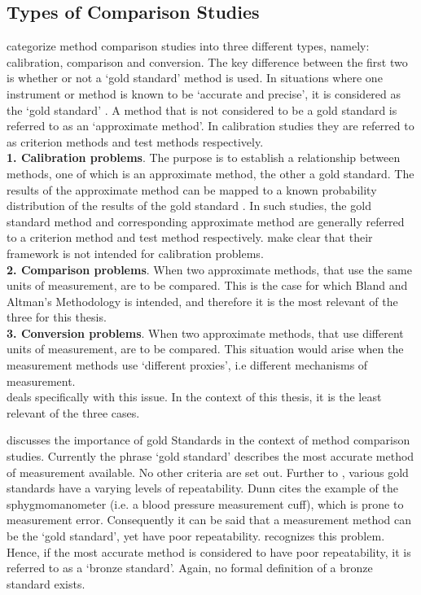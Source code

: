 \documentclass[12pt, a4paper]{report}
\theoremstyle{plain}
\theoremstyle{definition}
\theoremstyle{remark}
\begin{document}
	\subsection{Types of Comparison Studies}
	\citet{lewis1991} categorize method comparison studies into three
	different types, namely: calibration, comparison and conversion. The key difference between the first two is
	whether or not a `gold standard' method is used. In situations
	where one instrument or method is known to be `accurate and
	precise', it is considered as the `gold standard' \citep{lewis1991}. A
	method that is not considered to be a gold standard is referred to
	as an `approximate method'. In calibration studies they are
	referred to as criterion methods and test methods respectively.\\
    \smallskip
	\textbf{1. Calibration problems}. The purpose is to establish a
	relationship between methods, one of which is an approximate
	method, the other a gold standard. The results of the approximate
	method can be mapped to a known probability distribution of the
	results of the gold standard \citep{lewis1991}. In such studies, the
	gold standard method and corresponding approximate method are
	generally referred to a criterion method and test method
	respectively. \citet*{BA83} make clear that their framework is
	not intended for calibration problems.\\
	\smallskip \textbf{2. Comparison problems}. When two approximate
	methods, that use the same units of measurement, are to be
	compared. This is the case for which Bland and Altman's Methodology is intended, and therefore it is the most relevant of
	the three for this thesis.\\
	\smallskip \textbf{3. Conversion problems}. When two approximate
	methods, that use different units of measurement, are to be
	compared. This situation would arise when the measurement methods
	use `different proxies', i.e different mechanisms of measurement.\\
	\smallskip
	\citet{lewis1991} deals specifically with this issue. In the context
	of this thesis, it is the least relevant of the three cases.
	
		
		
			\citet{Aroy2015} discusses the importance of gold Standards in the context of method comparison studies.
			Currently the phrase `gold standard' describes the most accurate method of measurement available. No other criteria are set out. Further to \citet{DunnSEME}, various gold standards have a varying levels of repeatability. Dunn cites the example of the sphygmomanometer (i.e. a blood pressure measurement cuff), which is prone to measurement error. Consequently it can be said that a measurement method can be the `gold standard', yet have poor repeatability. \citet{DunnSEME} recognizes this problem. Hence, if the most accurate method is considered to have poor repeatability, it is referred to as a `bronze standard'.  Again, no formal definition of a bronze standard exists.
		
\end{document}
